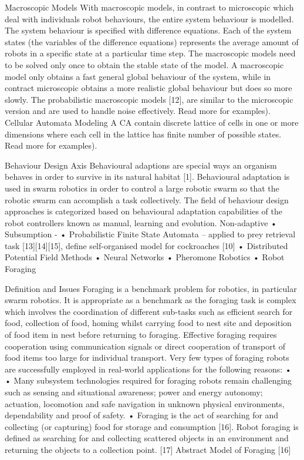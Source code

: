 Macroscopic Models
With macroscopic models, in contrast to microscopic which deal with individuals robot behaviours, the entire system behaviour is modelled. The system behaviour is specified with difference equations. Each of the system states (the variables of the difference equations) represents the average amount of robots in a specific state at a particular time step. The macroscopic models need to be solved only once to obtain the stable state of the model. A macroscopic model only obtains a fast general global behaviour of the system, while in contract microscopic obtains a more realistic global behaviour but does so more slowly. The probabilistic macroscopic models [12], are similar to the microscopic version and are used to handle noise effectively. Read more for examples). 
Cellular Automata Modeling 
A CA contain discrete lattice of cells in one or more dimensions where each cell in the lattice has finite number of possible states. Read more for examples). 

Behaviour Design Axis
Behavioural adaptions are special ways an organism behaves in order to survive in its natural habitat [1]. Behavioural adaptation is used in swarm robotics in order to control a large robotic swarm so that the robotic swarm can accomplish a task collectively. The field of behaviour design approaches is categorized based on behavioural adaptation capabilities of the robot controllers known as manual, learning and evolution. 
Non-adaptive
•	Subsumption - 
•	Probabilistic Finite State Automata – applied to prey retrieval task [13][14][15], define self-organised model for cockroaches [10]
•	Distributed Potential Field Methods
•	Neural Networks
•	Pheromone Robotics 
•	
Robot Foraging

Definition and Issues
Foraging is a benchmark problem for robotics, in particular swarm robotics. It is appropriate as a benchmark as the foraging task is complex which involves the coordination of different sub-tasks such as efficient search for food, collection of food, homing whilst  carrying food to nest site and deposition of food item in nest before returning to foraging. Effective foraging requires cooperation using communication signals or direct cooperation of transport of food items too large for individual transport. 
Very few types of foraging robots are successfully employed in real-world applications for the following reasons:
•	
•	Many subsystem technologies required for foraging robots remain challenging such as sensing and situational awareness; power and energy autonomy; actuation, locomotion and safe navigation in unknown physical environments, dependability and proof of safety.
•	
Foraging is the act of searching for and collecting (or capturing) food for storage and consumption [16]. Robot foraging is defined as searching for and collecting scattered objects in an environment and returning the objects to a collection point. [17]
Abstract Model of Foraging [16]

